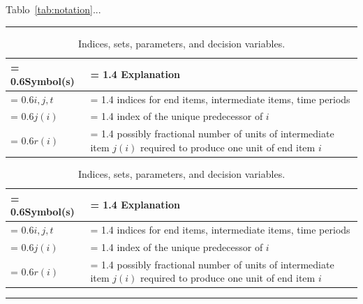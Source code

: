 \documentclass{article}
\begin{document}
\lipsum[1][4-5]

Tablo~\ref{tab:notation}...

\bigskip
\hrule
\bigskip

\lipsum[1][1-3]

\begin{table}[h]
\centering
\caption{Indices, sets, parameters, and decision variables.}
\begin{tabularx}{\textwidth}{
	>{\hsize = 0.6\hsize}X %
	>{\hsize = 1.4\hsize}X %
}	%
\hline
Symbol(s)	& Explanation \\
\hline
$i, j, t$	& indices for end items, intermediate items, time periods \\
$j(i)$	& index of the unique predecessor of $i$ \\
$r(i)$	& possibly fractional number of units of intermediate item $j(i)$ required to produce one unit of end item $i$ \\
\hline
\end{tabularx}
\end{table}

\lipsum[1][4-5]

\newpage


\lipsum[1][1-3]

\begin{table}[h]
\centering
\caption{Indices, sets, parameters, and decision variables.}
\begin{tabularx}{\textwidth}{
	>{\hsize = 0.6\hsize \centering\arraybackslash}X %
	>{\hsize = 1.4\hsize \raggedleft\arraybackslash}X %
}
\hline
Symbol(s)	& Explanation \\
\hline
$i, j, t$	& indices for end items, intermediate items, time periods \\
$j(i)$	& index of the unique predecessor of $i$ \\
$r(i)$	& possibly fractional number of units of intermediate item $j(i)$ required to produce one unit of end item $i$ \\
\hline
\end{tabularx}
\end{table}

\lipsum[1][4-5]

\bigskip
\hrule
\bigskip

\lipsum[1][1-3]
\end{document}
